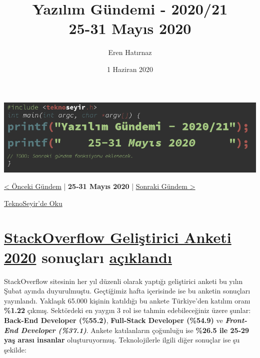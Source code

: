 \documentclass[11pt]{article}
\author{Eren Hatırnaz}
\date{1 Haziran 2020}
\title{Yazılım Gündemi - 2020/21\\\medskip
\large 25-31 Mayıs 2020}
\begin{document}
\maketitle
\tableofcontents \clearpage\shorthandoff{=}

\begin{center}
\includegraphics[width=.9\linewidth]{gorseller/yazilim-gundemi-banner.png}
\end{center}

\begin{center}
\href{../20/yazilim-gundemi-2020-20.pdf}{< Önceki Gündem} | \textbf{25-31 Mayıs 2020} | \href{../22/yazilim-gundemi-2020-22.pdf}{Sonraki Gündem >}

\href{https://teknoseyir.com/blog/yazilim-gundemi-2020-21}{TeknoSeyir'de Oku}
\end{center}

\section{\href{https://insights.stackoverflow.com/survey/2020}{StackOverflow Geliştirici Anketi 2020} sonuçları \href{https://stackoverflow.blog/2020/05/27/2020-stack-overflow-developer-survey-results/}{açıklandı}}
\label{sec:org3625313}
StackOverflow sitesinin her yıl düzenli olarak yaptığı geliştirici anketi bu
yılın Şubat ayında duyurulmuştu. Geçtiğimiz hafta içerisinde ise bu anketin
sonuçları yayınlandı. Yaklaşık 65.000 kişinin katıldığı bu ankete Türkiye'den
katılım oranı \textbf{\%1.22} çıkmış. Sektördeki en yaygın 3 rol ise tahmin
edebileceğiniz üzere şunlar: \textbf{Back-End Developer (\%55.2)}, \textbf{Full-Stack
Developer (\%54.9)} ve \emph{\textbf{Front-End Developer (\%37.1)}}. Ankete katılanların
çoğunluğu ise \textbf{\%26.5 ile 25-29 yaş arası insanlar} oluşturuyormuş.
Teknolojilerle ilgili diğer sonuçlar ise şu şekilde:
\end{document}
